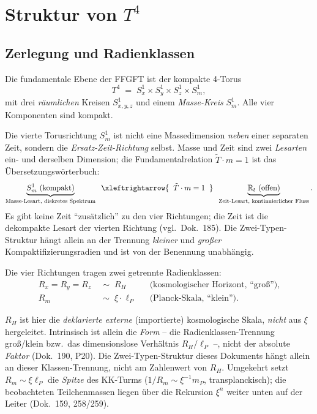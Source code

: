 \section{Struktur von $T^4$}

\subsection{Zerlegung und Radienklassen}

\begin{definition}\label{def:t4}
Die fundamentale Ebene der FFGFT ist der kompakte 4-Torus
\[
  T^4 \;=\; S^1_x \times S^1_y \times S^1_z \times S^1_m ,
\]
mit drei \emph{r\"aumlichen} Kreisen $S^1_{x,y,z}$ und einem
\emph{Masse-Kreis} $S^1_m$. Alle vier Komponenten sind kompakt.
\end{definition}

\begin{remark}\label{bem:struktur}
Die vierte Torusrichtung $S^1_m$ ist nicht eine Massedimension \emph{neben}
einer separaten Zeit, sondern die \emph{Ersatz-Zeit-Richtung} selbst. Masse und
Zeit sind zwei \emph{Lesarten} ein- und derselben Dimension; die
Fundamentalrelation $\tilde{T}\cdot m = 1$ ist das \"Ubersetzungsw\"orterbuch:
\[
  \underbrace{S^1_m \text{ (kompakt)}}_{\text{Masse-Lesart, diskretes Spektrum}}
  \;\;\xleftrightarrow{\;\;\tilde{T}\cdot m = 1\;\;}\;\;
  \underbrace{\mathbb{R}_t \text{ (offen)}}_{\text{Zeit-Lesart, kontinuierlicher Fluss}}.
\]
Es gibt keine Zeit ``zus\"atzlich'' zu den vier Richtungen; die Zeit ist die
dekompakte Lesart der vierten Richtung (vgl.\ Dok.~185). Die Zwei-Typen-Struktur
h\"angt allein an der Trennung \emph{kleiner} und \emph{gro\ss er}
Kompaktifizierungsradien und ist von der Benennung unabh\"angig.
\end{remark}

Die vier Richtungen tragen zwei getrennte Radienklassen:
\begin{align}
  R_x = R_y = R_z &\;\sim\; R_H
  && \text{(kosmologischer Horizont, ``gro\ss '')},\\
  R_m &\;\sim\; \xi \cdot \ell_P
  && \text{(Planck-Skala, ``klein'')}.
\end{align}

\begin{remark}\label{bem:skalen}
$R_H$ ist hier die \emph{deklarierte externe} (importierte) kosmologische Skala,
\emph{nicht} aus $\xi$ hergeleitet. Intrinsisch ist allein die \emph{Form} -- die
Radienklassen-Trennung gro\ss/klein bzw.\ das dimensionslose Verh\"altnis
$R_H/\ell_P$ --, nicht der absolute \emph{Faktor} (Dok.~190, P20). Die
Zwei-Typen-Struktur dieses Dokuments h\"angt allein an dieser Klassen-Trennung,
nicht am Zahlenwert von $R_H$. Umgekehrt setzt $R_m\sim\xi\ell_P$ die \emph{Spitze}
des KK-Turms ($1/R_m\sim\xi^{-1}m_P$, transplanckisch); die beobachteten
Teilchenmassen liegen \"uber die Rekursion $\xi^n$ weiter unten auf der Leiter
(Dok.~159, 258/259).
\end{remark}

